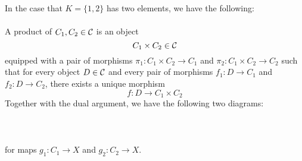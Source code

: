 \documentclass[a4paper]{article}
\begin{document}
In the case that $K=\{1,2\}$ has two elements, we have the following: \\~\\
A product of $C_1,C_2\in\mathcal{C}$ is an object $$C_1\times C_2\in\mathcal{C}$$ equipped with a pair of morphisms $\pi_1:C_1\times C_2\to C_1$ and $\pi_2:C_1\times C_2\to C_2$ such that for every object $D\in\mathcal{C}$ and every pair of morphisms $f_1:D\to C_1$ and $f_2:D\to C_2$, there exists a unique morphism $$f:D\to C_1\times C_2$$ Together with the dual argument, we have the following two diagrams: \\~\\
\\~\\
for maps $g_1:C_1\to X$ and $g_2:C_2\to X$. 
\end{document}
